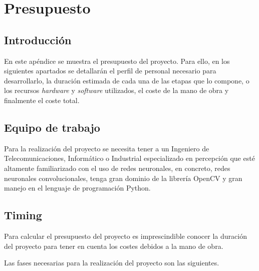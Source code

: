 
\chapter{Presupuesto}
\label{cha:presupuesto}

\section{Introducción}
\label{sec:intro-presupuesto}

En este apéndice se muestra el presupuesto del proyecto. Para ello, en los siguientes apartados se detallarán el perfil de personal necesario para desarrollarlo, la duración estimada de cada una de las etapas que lo compone, o los recursos \textit{hardware} y \textit{software} utilizados, el coste de la mano de obra y finalmente el coste total.

\section{Equipo de trabajo}
\label{sec:equipo-presupuesto}

Para la realización del proyecto se necesita tener a un Ingeniero de Telecomunicaciones, Informático o Industrial especializado en percepción que esté altamente familiarizado con el uso de redes neuronales, en concreto, redes neuronales convolucionales, tenga gran dominio de la librería OpenCV y gran manejo en el lenguaje de programación Python.

\section{Timing}
\label{sec:timing-presupuesto}

Para calcular el presupuesto del proyecto es imprescindible conocer la duración del proyecto para tener en cuenta los costes debidos a la mano de obra.

Las fases necesarias para la realización del proyecto son las siguientes.

